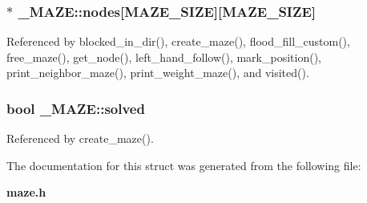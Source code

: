 \subsubsection[{nodes}]{$\ast$ \-\_\-\-M\-A\-Z\-E\-::nodes[{\bf M\-A\-Z\-E\-\_\-\-S\-I\-Z\-E}][{\bf M\-A\-Z\-E\-\_\-\-S\-I\-Z\-E}]}\label{struct__MAZE_a3c6979d722b6efaed52dd25f0f39ecd4}


Referenced by blocked\-\_\-in\-\_\-dir(), create\-\_\-maze(), flood\-\_\-fill\-\_\-custom(), free\-\_\-maze(), get\-\_\-node(), left\-\_\-hand\-\_\-follow(), mark\-\_\-position(), print\-\_\-neighbor\-\_\-maze(), print\-\_\-weight\-\_\-maze(), and visited().

\subsubsection[{solved}]{\setlength{\rightskip}{0pt plus 5cm}bool \-\_\-\-M\-A\-Z\-E\-::solved}\label{struct__MAZE_ab03f6f556019b42aa9b8b76e5b91edfd}


Referenced by create\-\_\-maze().



The documentation for this struct was generated from the following file\-:\begin{DoxyCompactItemize}
\item 
{\bf maze.\-h}\end{DoxyCompactItemize}
